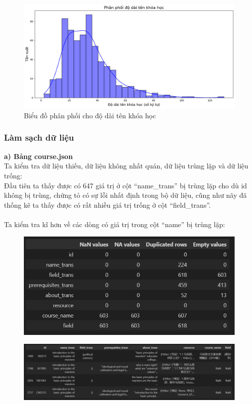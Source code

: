 \newpage
\begin{figure}
    \centering
    \includegraphics[width=0.75\linewidth]{figures/44.png}
    \caption{Biểu đồ phân phối cho độ dài tên khóa học}
\end{figure}
\subsubsection{Làm sạch dữ liệu}
\textbf{a) Bảng course.json}\\
Ta kiểm tra dữ liệu thiếu, dữ liệu không nhất quán, dữ liệu trùng lặp và dữ liệu trống:
\\
Đầu tiên ta thấy được có 647 giá trị ở cột “name\_trans” bị trùng lặp cho dù id không bị trùng, chứng tỏ có sự lỗi nhất định trong bộ dữ liệu, cũng như nãy đã thống kê ta thấy được có rất nhiều giá trị trống ở cột “field\_trans”.\\
\\
Ta kiểm tra kĩ hơn về các dòng có giá trị trong cột “name” bị trùng lặp:
\begin{figure}[h]
    \centering
    \includegraphics[width=1\linewidth]{figures/26.png}
\end{figure}
\newpage
\begin{figure}
    \centering
    \includegraphics[width=1\linewidth]{figures/45.png}
\end{figure}
